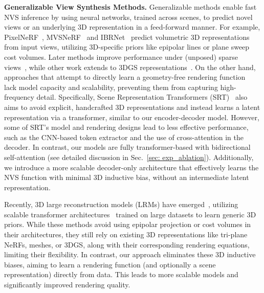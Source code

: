 \textbf{Generalizable View Synthesis Methods.} 
Generalizable methods enable fast NVS inference by using neural networks, trained across scenes, to predict novel views or an underlying 3D representation in a feed-forward manner. 
For example, PixelNeRF~\citep{yu2021pixelnerfneuralradiancefields}, MVSNeRF~\citep{chen2021mvsnerffastgeneralizableradiance} and IBRNet~\citep{wang2021ibrnetlearningmultiviewimagebased} predict volumetric 3D representations from input views, utilizing 3D-specific priors like epipolar lines or plane sweep cost volumes. 
Later methods improve performance under (unposed) sparse views~\citep{liu2022neuralray, johari2022geonerfgeneralizingnerfgeometry,jiang2024forge, szymanowicz2024splatter_image,jiang2023leap},
while other work extends to 3DGS representations~\cite{charatan2024pixelsplat, szymanowicz2024flash3d,chen2024mvsplatefficient3dgaussian,tang2024lgm}.
On the other hand, approaches that attempt to directly learn a geometry-free rendering function~\citep{suhail2022gpnr, sajjadi2022srt, sitzmann2021lightfieldnetwork, rombach2021geometry, kulhanek2022viewformer} lack model capacity and scalability, preventing them from capturing high-frequency detail. 
Specifically, Scene Representation Transformers (SRT)~\citep{sajjadi2022srt} also aims to avoid explicit, handcrafted 3D representations and instead learns a latent representation via a transformer, similar to our encoder-decoder model. However, some of SRT's model and rendering designs lead to less effective performance, such as the CNN-based token extractor and the use of cross-attention in the decoder. In contrast, our models are fully transformer-based with bidirectional self-attention (see detailed discussion in Sec.~\ref{sec: exp_ablation}).
Additionally, we introduce a more scalable decoder-only architecture that effectively learns the NVS function with minimal 3D inductive bias, without an intermediate latent representation.

Recently, 3D large reconstruction models (LRMs) have emerged~\citep{hong2024lrmlargereconstructionmodel,li2023instant3d, wang2023pflrm,xu2023dmv3d, wei2024meshlrm,zhang2024gslrmlargereconstructionmodel,xie2024lrmzero}, utilizing scalable transformer architectures~\citep{vaswani2017transformer} trained on large datasets to learn generic 3D priors. While these methods avoid using epipolar projection or cost volumes in their architectures, they still rely on existing 3D representations like tri-plane NeRFs, meshes, or 3DGS, along with their corresponding rendering equations, limiting their flexibility.
In contrast, our approach eliminates these 3D inductive biases, aiming to learn a rendering function (and optionally a scene representation) directly from data. This leads to more scalable models and significantly improved rendering quality. 

